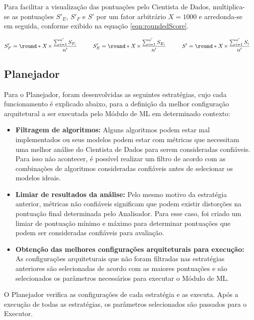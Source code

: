 \documentclass[portugues]{ic-tese}
\DeclarePairedDelimiter{\round}\lfloor\rceil
\let\oldtimes\times
\def\times{{\mkern1mu\oldtimes\mkern1mu}}
\begin{document}
Para facilitar a visualização das pontuações pelo Cientista de Dados, multiplica-se as pontuações $S'_E$, $S'_F$ e $S'$ por um fator arbitrário $X = 1000$ e arredonda-se em seguida, conforme exibido na equação \ref{eqn:roundedScore}.

\begin{equation}
\label{eqn:roundedScore}
	S'_F = \round*{X \times \frac{\sum_{i=1}^{n'} S_{F_i}}{n'}}\;\;\;\;\;\;\;\;\;\;
	S'_E = \round*{X \times \frac{\sum_{i=1}^{n'} S_{E_i}}{n'}}\;\;\;\;\;\;\;\;\;\;
	S' = \round*{X \times \frac{\sum_{i=1}^{n'} S_i}{n'}}
\end{equation}

\subsection{Planejador}

Para o Planejador, foram desenvolvidas as seguintes estratégias, cujo cada funcionamento é explicado abaixo, para a definição da melhor configuração arquitetural a ser executada pelo Módulo de ML em determinado contexto:

\begin{itemize}
\item \textbf{Filtragem de algoritmos:} Alguns algoritmos podem estar mal implementados ou seus modelos podem estar com métricas que necessitam uma melhor análise do Cientista de Dados para serem consideradas confiáveis. Para isso não acontecer, é possível realizar um filtro de acordo com as combinações de algoritmos consideradas confiáveis antes de selecionar os modelos ideais.
\item \textbf{Limiar de resultados da análise:} Pelo mesmo motivo da estratégia anterior, métricas não confiáveis significam que podem existir distorções na pontuação final determinada pelo Analisador. Para esse caso, foi criado um limiar de pontuação mínimo e máximo para determinar pontuações que podem ser consideradas confiáveis para avaliação.
\item \textbf{Obtenção das melhores configurações arquiteturais para execução:} As configurações arquiteturais que não foram filtradas nas estratégias anteriores são selecionadas de acordo com as maiores pontuações e são selecionados os parâmetros necessários para executar o Módulo de ML.
\end{itemize}

O Planejador verifica as configurações de cada estratégia e as executa. Após a execução de todas as estratégias, os parâmetros selecionados são passados para o Executor.
\end{document}
